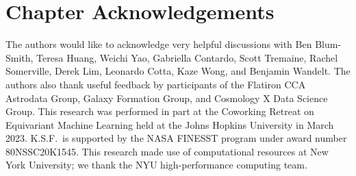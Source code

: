 \section{Chapter Acknowledgements}
The authors would like to acknowledge very helpful discussions with Ben Blum-Smith, Teresa Huang, Weichi Yao, Gabriella Contardo, Scott Tremaine, Rachel Somerville, Derek Lim, Leonardo Cotta, Kaze Wong, and Benjamin Wandelt.
The authors also thank useful feedback by participants of the Flatiron CCA Astrodata Group, Galaxy Formation Group, and Cosmology X Data Science Group.
This research was performed in part at the Coworking Retreat on Equivariant Machine Learning held at the Johns Hopkins University in March 2023.
K.S.F.~is supported by the NASA FINESST program under award number 80NSSC20K1545.
This research made use of computational resources at New York University; we thank the NYU high-performance computing team.